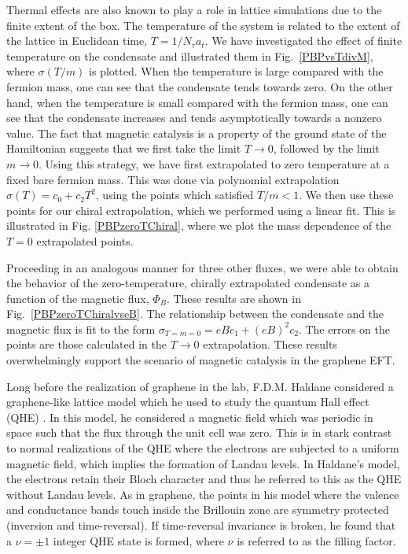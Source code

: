 \documentclass[aps,prd,twocolumn,showpacs,superscriptaddress,groupedaddress]{revtex4}  %
\begin{document}
Thermal effects are also known to play a role in lattice simulations due to the finite extent of the box. The temperature of the system is related to the extent of the lattice in Euclidean time, $T = 1/N_{\tau}a_t$. We have investigated the effect of finite temperature on the condensate and illustrated them in Fig.~\ref{PBPvsTdivM}, where $\sigma(T/m)$ is plotted. When the temperature is large 
compared with the fermion mass, one can see that the condensate tends towards zero. On the other hand, when the temperature is small compared with the fermion mass, one can see that the condensate increases and tends asymptotically towards a nonzero value. The fact that magnetic catalysis is a property of the ground state of the Hamiltonian suggests that we first take the limit $T \to 0$, followed
by the limit $m \to 0$. Using this strategy, we have first extrapolated to zero temperature at a fixed bare fermion mass. This was done via polynomial extrapolation $\sigma(T) = c_0 + c_2T^2$, using the points which satisfied $T/m < 1$. We then use these points for our chiral extrapolation, which we performed using a linear fit. This is illustrated in Fig. \ref{PBPzeroTChiral}, where we plot the mass dependence of the $T=0$ extrapolated points.

Proceeding in an analogous manner for three other fluxes, we were able to obtain the behavior of the zero-temperature, chirally extrapolated condensate as a function of the magnetic flux, $\Phi_B$. These results are shown in Fig.~\ref{PBPzeroTChiralvseB}.
The relationship between the condensate and the magnetic flux is fit to the form $\sigma_{T=m=0} = eBc_1 + (eB)^2c_2$. The errors on the points are those calculated in the $T \to 0$ extrapolation. These results overwhelmingly support the scenario of magnetic catalysis in the graphene EFT.

Long before the realization of graphene in the lab, F.D.M. Haldane considered a graphene-like lattice model which he used to study the quantum Hall effect (QHE) \cite{Haldane}.
In this model, he considered a magnetic field which was periodic in space such that the flux through the unit cell was zero. This is in stark contrast to normal realizations of the QHE 
where the electrons are subjected to a uniform magnetic field, which implies the formation of Landau levels. In Haldane's model, the electrons retain their Bloch character and thus he referred to 
this as the QHE without Landau levels. As in graphene, the points in his model where the valence and conductance bands touch inside the Brillouin zone are symmetry protected (inversion and time-reversal).
If time-reversal invariance is broken, he found that a $\nu = \pm 1$ integer QHE state is formed, where $\nu$ is referred to as the filling factor. 
\end{document}
